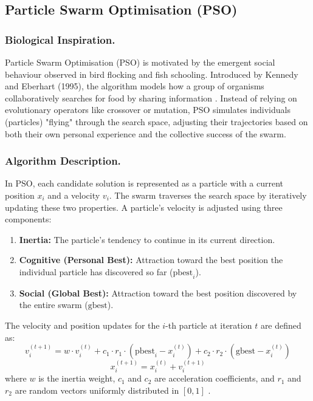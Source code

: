 \subsection{Particle Swarm Optimisation (PSO)}

\subsubsection{Biological Inspiration.}
Particle Swarm Optimisation (PSO) is motivated by the emergent social behaviour observed in bird flocking and fish schooling. Introduced by Kennedy and Eberhart (1995), the algorithm models how a group of organisms collaboratively searches for food by sharing information \autocite{KennedyEberhart1995}. Instead of relying on evolutionary operators like crossover or mutation, PSO simulates individuals (particles) "flying" through the search space, adjusting their trajectories based on both their own personal experience and the collective success of the swarm.

\subsubsection{Algorithm Description.}
In PSO, each candidate solution is represented as a particle with a current position $x_i$ and a velocity $v_i$. The swarm traverses the search space by iteratively updating these two properties. A particle's velocity is adjusted using three components:
\begin{enumerate}
    \item \textbf{Inertia:} The particle's tendency to continue in its current direction.
    \item \textbf{Cognitive (Personal Best):} Attraction toward the best position the individual particle has discovered so far ($\text{pbest}_i$).
    \item \textbf{Social (Global Best):} Attraction toward the best position discovered by the entire swarm ($\text{gbest}$).
\end{enumerate}
The velocity and position updates for the $i$-th particle at iteration $t$ are defined as:
$$v_i^{(t+1)} = w \cdot v_i^{(t)} + c_1 \cdot r_1 \cdot (\text{pbest}_i - x_i^{(t)}) + c_2 \cdot r_2 \cdot (\text{gbest} - x_i^{(t)})$$
$$x_i^{(t+1)} = x_i^{(t)} + v_i^{(t+1)}$$
where $w$ is the inertia weight, $c_1$ and $c_2$ are acceleration coefficients, and $r_1$ and $r_2$ are random vectors uniformly distributed in $[0, 1]$ \autocite{KennedyEberhart1995,WangEtAl2018PSO}.

